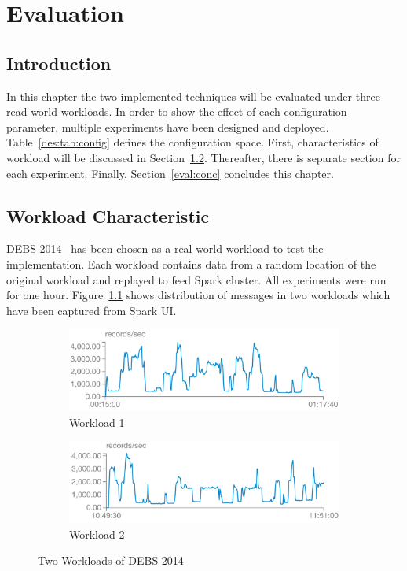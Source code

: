 \chapter{Evaluation}
\label{eval}

\section{Introduction}
In this chapter the two implemented techniques will be evaluated under three read world workloads. In order to show the effect of each configuration parameter, multiple experiments have been designed and deployed. Table~\ref{des:tab:config} defines the configuration space. First, characteristics of workload will be discussed in Section~\ref{eval:workload}. Thereafter, there is separate section for each experiment. Finally, Section~\ref{eval:conc} concludes this chapter.

\section{Workload Characteristic}
\label{eval:workload}

DEBS 2014~\cite{debs2014} has been chosen as a real world workload to test the implementation. Each workload contains data from a random location of the original workload and replayed to feed Spark cluster. All experiments were run for one hour. Figure~\ref{eval:fig:workload} shows distribution of messages in two workloads which have been captured from Spark UI.
\begin{figure}[!htbp]
    \centering
      \begin{subfigure}[h]{\linewidth}
        \centering\includegraphics[scale=0.6]{workload1.png}
        \caption{Workload 1}
    \end{subfigure}
    \begin{subfigure}[h]{\linewidth}
        \centering\includegraphics[scale=0.6]{workload2.png}
        \caption{Workload 2}
    \end{subfigure}
    \caption{Two Workloads of DEBS 2014}
    \label{eval:fig:workload}
\end{figure}

